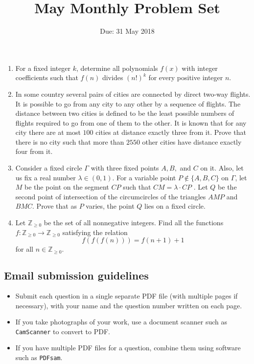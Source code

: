 \documentclass[12pt]{article}
\title{May Monthly Problem Set}
\author{Due: 31 May 2018}
\date{}
\begin{document}
 \vspace{-12pt} \maketitle \pagestyle{empty}

\begin{enumerate}

\item %
For a fixed integer $k$, determine all polynomials $f(x)$ with integer coefficients such that $f(n)$ divides $(n!)^k$ for every positive integer $n$.

\item %
In some country several pairs of cities are connected by direct two-way flights. It is possible to go from any city to any other by a sequence of flights. The distance between two cities is defined to be the least possible numbers of flights required to go from one of them to the other. It is known that for any city there are at most $100$ cities at distance exactly three from it. Prove that there is no city such that more than $2550$ other cities have distance exactly four from it.

\item %
Consider a fixed circle $\Gamma$ with three fixed points $A, B,$ and $C$ on it. Also, let us fix a real number $\lambda \in(0,1)$. For a variable point $P \not\in\{A, B, C\}$ on $\Gamma$, let $M$ be the point on the segment $CP$ such that $CM =\lambda\cdot  CP$ . Let $Q$ be the second point of intersection of the circumcircles of the triangles $AMP$ and $BMC$. Prove that as $P$ varies, the point $Q$ lies on a fixed circle.

\item %
Let $\mathbb{Z}_{\ge 0}$ be the set of all nonnegative integers. Find all the functions $f: \mathbb{Z}_{\ge 0} \rightarrow \mathbb{Z}_{\ge 0} $ satisfying the relation
\[ f(f(f(n))) = f(n+1 ) +1 \]
for all $ n\in \mathbb{Z}_{\ge 0}$.

\end{enumerate}


\small
\subsection*{Email submission guidelines}

\begin{itemize}
\item Submit each question in a single separate PDF file (with multiple pages if necessary), with your name and the question number written on each page.
\item If you take photographs of your work, use a document scanner such as \verb!CamScanner! to convert to PDF.
\item If you have multiple PDF files for a question, combine them using software such as \verb!PDFsam!.
\end{itemize}
\end{document}

